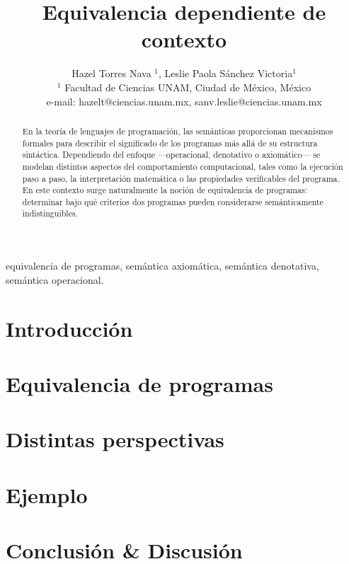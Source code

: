 \documentclass[journal]{IEEEtran}
\title{Equivalencia dependiente de contexto}
\author{Hazel Torres Nava $^{1}$, Leslie Paola Sánchez Victoria$^{1}$ \\
	\normalsize $^{1}$ Facultad de Ciencias UNAM, Ciudad de México, México \\
	\normalsize e-mail: hazelt@ciencias.unam.mx, sanv.leslie@ciencias.unam.mx
}
\theoremstyle{definition}
\begin{document}
\maketitle

\begin{abstract}
En la teoría de lenguajes de programación, las semánticas proporcionan mecanismos formales para describir el significado de los programas más allá de su estructura sintáctica. Dependiendo del enfoque —operacional, denotativo o axiomático— se modelan distintos aspectos del comportamiento computacional, tales como la ejecución paso a paso, la interpretación matemática o las propiedades verificables del programa. En este contexto surge naturalmente la noción de equivalencia de programas: determinar bajo qué criterios dos programas pueden considerarse semánticamente indistinguibles.
\end{abstract}

\begin{IEEEkeywords}
  equivalencia de programas, semántica axiomática, semántica denotativa, semántica operacional.
\end{IEEEkeywords}

\section{Introducción}


\section{Equivalencia de programas}
\label{sec:equivprogram}



\section{Distintas perspectivas}



\section{Ejemplo}


\section{Conclusión \& Discusión}



\nocite{*}
 

\end{document}

